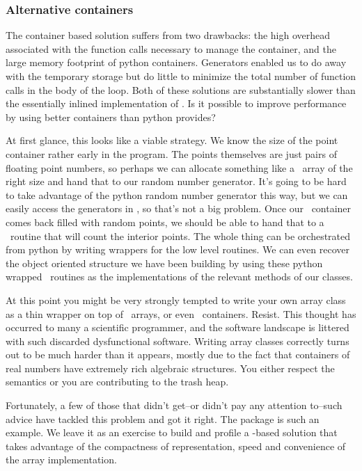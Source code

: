 \subsubsection{Alternative containers}
\label{sec:classes:alternatives}

The container based solution suffers from two drawbacks: the high overhead associated with the
function calls necessary to manage the container, and the large memory footprint of python
containers. Generators enabled us to do away with the temporary storage but do little to
minimize the total number of function calls in the body of the loop. Both of these solutions
are substantially slower than the essentially inlined implementation of .
Is it possible to improve performance by using better containers than python provides?

At first glance, this looks like a viable strategy. We know the size of the point container
rather early in the program. The points themselves are just pairs of floating point numbers, so
perhaps we can allocate something like a \cc\ array of the right size and hand that to our
random number generator. It's going to be hard to take advantage of the python random number
generator this way, but we can easily access the generators in , so that's not a big
problem. Once our \cc\ container comes back filled with random points, we should be able to
hand that to a \cc\ routine that will count the interior points. The whole thing can be
orchestrated from python by writing wrappers for the low level routines. We can even recover
the object oriented structure we have been building by using these python wrapped \cc\ routines
as the implementations of the relevant methods of our classes. 

At this point you might be very strongly tempted to write your own array class as a thin
wrapper on top of \cc\ arrays, or even \cpp\ containers. Resist. This thought has occurred to
many a scientific programmer, and the software landscape is littered with such discarded
dysfunctional software. Writing array classes correctly turns out to be much harder than it
appears, mostly due to the fact that containers of real numbers have extremely rich algebraic
structures. You either respect the semantics or you are contributing to the trash heap.

Fortunately, a few of those that didn't get--or didn't pay any attention to--such advice have
tackled this problem and got it right. The package \supercite{numpy} is such an
example. We leave it as an exercise to build and profile a -based solution
that takes advantage of the compactness of representation, speed and convenience of the array
implementation.

